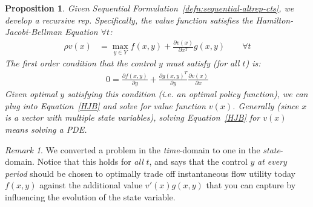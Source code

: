 \documentclass[12pt]{book}
\numberwithin{equation}{section} %
\theoremstyle{plain}
\newtheorem{prop}[thm]{Proposition}
\theoremstyle{definition}
\theoremstyle{remark}
\newtheorem*{rmk}{Remark}
\begin{document}
\begin{prop}
Given Sequential Formulation~\ref{defn:sequential-altrep-cts},
we develop a recursive rep.
Specifically, the value function satisfies the
\emph{Hamilton-Jacobi-Bellman Equation} $\forall t$:
\begin{align}
  \rho v(x)
  &= \max_{y\in Y} f(x,y) + \frac{\partial v(x)}{\partial x^T} g(x,y)
  \qquad\forall t
  \label{HJB}
\end{align}
The first order condition that the control $y$ must satisfy (for all
$t$) is:
\begin{align*}
  0 =
  \frac{\partial f(x,y)}{\partial y}
  +
  \frac{\partial g(x,y)^T}{\partial y}
  \frac{\partial v(x)}{\partial x}
\end{align*}
Given optimal $y$ satisfying this condition (i.e. an optimal policy
function), we can plug into Equation~\ref{HJB} and solve for value
function $v(x)$.
Generally (since $x$ is a vector with multiple state variables), solving
Equation~\ref{HJB} for $v(x)$ means solving a PDE.
\end{prop}
\begin{rmk}
We converted a problem in the \emph{time}-domain to one in the
\emph{state}-domain. Notice that this holds for \emph{all} $t$, and says
that the control $y$ \emph{at every period} should be chosen to
optimally trade off instantaneous flow utility today $f(x,y)$ against
the additional value $v'(x)g(x,y)$ that you can capture by influencing
the evolution of the state variable.
\end{rmk}
\end{document}

